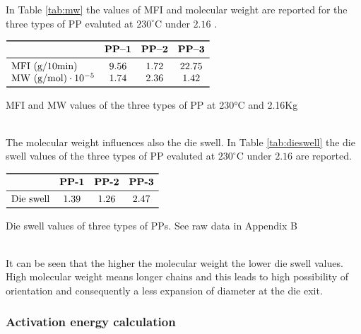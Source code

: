 \documentclass[a4paper, 11pt]{article}
\begin{document}
In Table \ref{tab:mw} the values of MFI and molecular weight are reported for the three types of PP evaluted at $230 ^\circ$C under $2.16$ .
\begin{table}[htp]
\centering
$
\begin{array}{lccc}
\toprule
\text{} & \textbf{PP–1} & \textbf{PP–2} & \textbf{PP–3} \\
\midrule
\text{MFI (g/10min)} & 9.56 & 1.72 & 22.75  \\
\text{MW (g/mol)}\cdot 10^{-5} & 1.74 & 2.36 & 1.42 \\
\bottomrule
\end{array}
$
\caption{MFI and MW values of the three types of PP at 230°C and 2.16Kg}
\label{tab:mw}
\end{table}\\
The molecular weight influences also the die swell. In Table \ref{tab:dieswell} the die swell values of the three types of PP evaluted at $230 ^\circ$C under $2.16$  are reported.
\begin{table}[htp]
\centering
$
\begin{array}{cccc}
\toprule
\text{} & \textbf{PP-1} & \textbf{PP-2} & \textbf{PP-3} \\
\midrule
\text{Die swell} & 1.39 & 1.26 & 2.47  \\
\bottomrule
\end{array}
$
\caption{Die swell values of three types of PPs. See raw data in Appendix B}
\label{tab:dieswell}
\end{table}\\
It can be seen that the higher the molecular weight the lower die swell values. High molecular weight means longer chains and this leads to high possibility of orientation and consequently a less expansion of diameter at the die exit.

\newpage

\subsubsection{Activation energy calculation}
\end{document}
